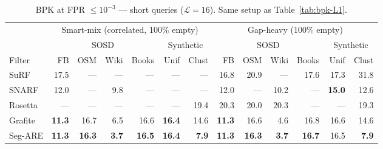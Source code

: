 \begin{table}[H]
    \centering
    \footnotesize
    \setlength{\tabcolsep}{4pt}
    \begin{tabular}{@{}lrrrrrr|rrrrrr@{}}
        \toprule
        & \multicolumn{6}{c|}{Smart-mix (correlated, 100\% empty)} & \multicolumn{6}{c}{Gap-heavy (100\% empty)} \\
        \cmidrule(lr){2-7} \cmidrule(lr){8-13}
        & \multicolumn{4}{c}{SOSD} & \multicolumn{2}{c|}{Synthetic} & \multicolumn{4}{c}{SOSD} & \multicolumn{2}{c}{Synthetic} \\
        \cmidrule(lr){2-5} \cmidrule(lr){6-7} \cmidrule(lr){8-11} \cmidrule(lr){12-13}
        Filter & FB & OSM & Wiki & Books & Unif & Clust & FB & OSM & Wiki & Books & Unif & Clust \\
        \midrule
        SuRF    & 17.5          & \textnormal{---} & \textnormal{---} & \textnormal{---} & \textnormal{---} & \textnormal{---} & 16.8          & 20.9          & \textnormal{---} & 17.6          & 17.3          & 31.8 \\
        SNARF   & 12.0          & \textnormal{---} & 9.8           & \textnormal{---} & \textnormal{---} & \textnormal{---} & 12.0          & \textnormal{---} & 10.2          & \textnormal{---} & \textbf{15.0} & 12.6 \\
        Rosetta & \textnormal{---} & \textnormal{---} & \textnormal{---} & \textnormal{---} & \textnormal{---} & 19.4          & 20.3          & 20.0          & 20.3          & \textnormal{---} & \textnormal{---} & 19.3 \\
        Grafite & \textbf{11.3} & 16.7          & 6.5           & 16.6          & \textbf{16.4} & 14.6          & \textbf{11.3} & 16.6          & 4.6           & 16.8          & 16.6          & 14.6 \\
        Seg-ARE & \textbf{11.3} & \textbf{16.3} & \textbf{3.7}  & \textbf{16.5} & \textbf{16.4} & \textbf{7.9}  & \textbf{11.3} & \textbf{16.3} & \textbf{3.7}  & \textbf{16.7} & 16.5          & \textbf{7.9} \\
        \bottomrule
    \end{tabular}
    \caption{BPK at FPR $\leq 10^{-3}$ --- short queries ($\mathcal{L}=16$).
             Same setup as Table~\ref{tab:bpk-L1}.}
    \label{tab:bpk-L16}
\end{table}

